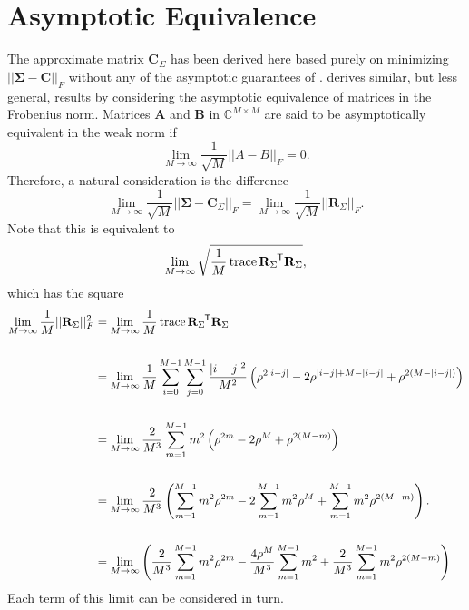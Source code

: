 \documentclass[letterpaper,12pt,oneside,final]{article}
\newcommand{\m}[1]{\mathbf{#1}}               %
\newcommand{\sm}[1]{\boldsymbol{#1}}   %
\newcommand{\tr}[1]{{#1}^{\mkern-1.5mu\mathsf{T}}}              %
\newcommand{\norm}[1]{||{#1}||}              %
\newcommand{\frob}[1]{\norm{#1}_F}
\newcommand{\abs}[1]{\lvert{#1}\rvert}              %
\newcommand*{\trace}{\operatorname{trace}}
\newcommand{\field}[1]{\mathbb{#1}}
\newcommand{\Complex}{\field{C}}
\begin{document}
\section{Asymptotic Equivalence} \label{c:multipleTesting:asympEquiv}

The approximate matrix $\m{C}_{\Sigma}$ has been derived here based purely on minimizing $\frob{\sm{\Sigma} - \m{C}}$ without any of the asymptotic guarantees of \cite{grenanderszego1958}. \cite{gray2006toeplitz} derives similar, but less general, results by considering the asymptotic equivalence of matrices in the Frobenius norm. Matrices $\m{A}$ and $\m{B}$ in $\Complex^{M \times M}$ are said to be asymptotically equivalent in the weak norm if
$$\lim_{M \rightarrow \infty} \frac{1}{\sqrt{M}} \frob{A - B} = 0.$$
Therefore, a natural consideration is the difference
\begin{equation} \label{eq:multipleTesting:asympEq}
  \lim_{M \rightarrow \infty} \frac{1}{\sqrt{M}} \frob{\sm{\Sigma} - \m{C}_{\Sigma}} = \lim_{M \rightarrow \infty} \frac{1}{\sqrt{M}} \frob{\m{R}_{\Sigma}}.
\end{equation}
Note that this is equivalent to
$$\lim_{M \rightarrow \infty} \sqrt{ \frac{1}{M} \trace{\tr{\m{R}_{\Sigma}} \m{R}_{\Sigma}} },$$
which has the square
\begin{equation} \label{eq:multipleTesting:asymTrace}
  \begin{aligned}
    \lim_{M \rightarrow \infty} \frac{1}{M} \frob{\m{R}_{\Sigma}}^2 & = \lim_{M \rightarrow \infty} \frac{1}{M} \trace{\tr{\m{R}_{\Sigma}} \m{R}_{\Sigma}} \\
    & \\
    & = \lim_{M \rightarrow \infty} \frac{1}{M} \sum_{i = 0}^{M-1} \sum_{j = 0}^{M-1} \frac{\abs{i-j}^2}{M^2} \left ( \rho^{2\abs{i-j}} - 2 \rho^{\abs{i-j} + M - \abs{i-j}} + \rho^{2(M - \abs{i-j})} \right ) \\
    & \\
    & =  \lim_{M \rightarrow \infty} \frac{2}{M^3} \sum_{m = 1}^{M-1} m^2 \left ( \rho^{2m} - 2 \rho^{M} + \rho^{2(M - m)} \right ) \\
    & \\
    & = \lim_{M \rightarrow \infty} \frac{2}{M^3} \left ( \sum_{m = 1}^{M-1} m^2 \rho^{2m} - 2 \sum_{m = 1}^{M-1} m^2 \rho^M + \sum_{m = 1}^{M-1} m^2 \rho^{2(M-m)} \right ). \\
    & \\
    & = \lim_{M \rightarrow \infty} \left ( \frac{2}{M^3} \sum_{m = 1}^{M-1} m^2 \rho^{2m} - \frac{4\rho^M}{M^3} \sum_{m = 1}^{M-1} m^2 + \frac{2}{M^3} \sum_{m = 1}^{M-1} m^2 \rho^{2(M-m)} \right )
  \end{aligned}
\end{equation}
Each term of this limit can be considered in turn.
\end{document}
